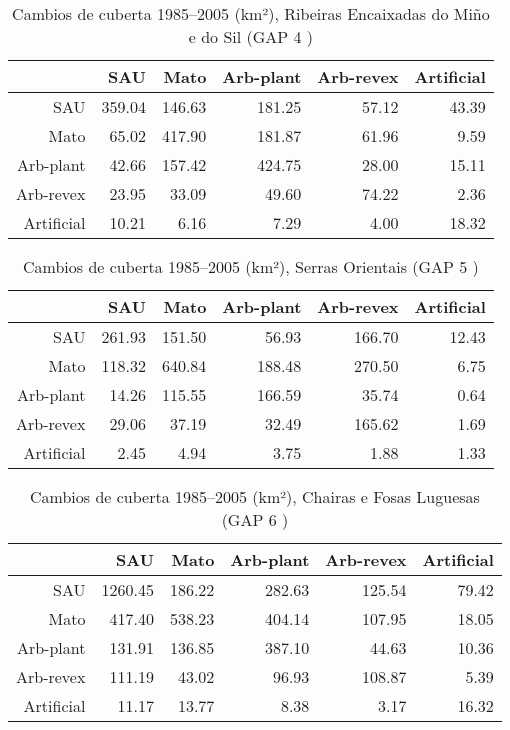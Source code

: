 \begin{table}[p]
\centering
\caption{Cambios de cuberta 1985--2005 (km²), Ribeiras Encaixadas do Miño e do Sil (GAP 4 )} 
\label{TaboaContinxGAP4}
\begin{tabular}{rrrrrr}
  \hline
 & SAU & Mato & Arb-plant & Arb-revex & Artificial \\ 
  \hline
SAU & 359.04 & 146.63 & 181.25 & 57.12 & 43.39 \\ 
  Mato & 65.02 & 417.90 & 181.87 & 61.96 & 9.59 \\ 
  Arb-plant & 42.66 & 157.42 & 424.75 & 28.00 & 15.11 \\ 
  Arb-revex & 23.95 & 33.09 & 49.60 & 74.22 & 2.36 \\ 
  Artificial & 10.21 & 6.16 & 7.29 & 4.00 & 18.32 \\ 
   \hline
\end{tabular}
\end{table}
\begin{table}[p]
\centering
\caption{Cambios de cuberta 1985--2005 (km²), Serras Orientais (GAP 5 )} 
\label{TaboaContinxGAP5}
\begin{tabular}{rrrrrr}
  \hline
 & SAU & Mato & Arb-plant & Arb-revex & Artificial \\ 
  \hline
SAU & 261.93 & 151.50 & 56.93 & 166.70 & 12.43 \\ 
  Mato & 118.32 & 640.84 & 188.48 & 270.50 & 6.75 \\ 
  Arb-plant & 14.26 & 115.55 & 166.59 & 35.74 & 0.64 \\ 
  Arb-revex & 29.06 & 37.19 & 32.49 & 165.62 & 1.69 \\ 
  Artificial & 2.45 & 4.94 & 3.75 & 1.88 & 1.33 \\ 
   \hline
\end{tabular}
\end{table}
\begin{table}[p]
\centering
\caption{Cambios de cuberta 1985--2005 (km²), Chairas e Fosas Luguesas (GAP 6 )} 
\label{TaboaContinxGAP6}
\begin{tabular}{rrrrrr}
  \hline
 & SAU & Mato & Arb-plant & Arb-revex & Artificial \\ 
  \hline
SAU & 1260.45 & 186.22 & 282.63 & 125.54 & 79.42 \\ 
  Mato & 417.40 & 538.23 & 404.14 & 107.95 & 18.05 \\ 
  Arb-plant & 131.91 & 136.85 & 387.10 & 44.63 & 10.36 \\ 
  Arb-revex & 111.19 & 43.02 & 96.93 & 108.87 & 5.39 \\ 
  Artificial & 11.17 & 13.77 & 8.38 & 3.17 & 16.32 \\ 
   \hline
\end{tabular}
\end{table}
